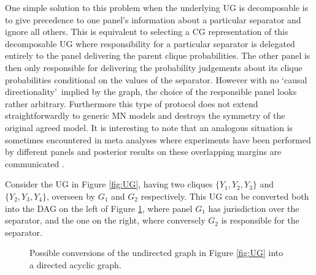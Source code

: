 One simple solution to this problem when the underlying UG is decomposable is to give precedence to one panel's information about a particular separator and ignore all others. This is equivalent to selecting a CG representation of this decomposable UG where responsibility for a particular separator is delegated entirely to the panel delivering the parent clique probabilities. The other panel is then only responsible for delivering the probability judgements about its clique probabilities conditional on the values of the separator. However with no \lq{causal directionality}\rq ~implied by the graph, the choice of the responsible panel looks rather arbitrary. Furthermore this type of protocol does not extend straightforwardly to generic MN models and destroys the symmetry of the original agreed model. It is interesting to note that an analogous situation is sometimes encountered in meta analyses where experiments have been performed by different panels and posterior results on these overlapping margins are communicated \citep[see e.g.][]{Massa2010, Jirousek2003}.

\begin{example}
Consider the UG in Figure \ref{fig:UG}, having two cliques $\{Y_1,Y_2,Y_3\}$ and $\{Y_2,Y_3,Y_4\}$, overseen by $G_1$ and $G_2$ respectively. This UG can be converted both into the DAG on the left of Figure \ref{fig:UGCG}, where panel $G_1$ has jurisdiction over the separator, and the one on the right, where conversely $G_2$ is responsible for the separator. 
\end{example}

\begin{figure}
\begin{center}
\hspace{2cm}
\end{center}
\caption{Possible conversions of the undirected graph in Figure \ref{fig:UG} into a directed acyclic graph.\label{fig:UGCG}}
\end{figure}

